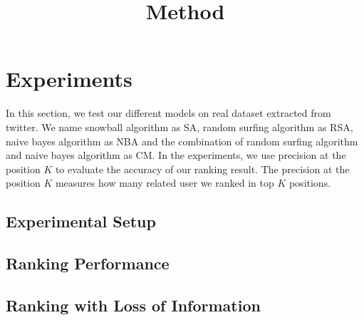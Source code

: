 \documentclass{article}
\begin{document}
\title{Method}
\maketitle \else \fi

\section{Experiments}\label{sec:experiment}
In this section, we test our different models on real dataset extracted from twitter. We name snowball algorithm as SA, random surfing algorithm as RSA, naive bayes algorithm as NBA and the combination of random surfing algorithm and naive bayes algorithm as CM. In the experiments, we use precision at the position $K$ to evaluate the accuracy of our ranking result. The precision at the position $K$ measures how many related user we ranked in top $K$ positions. 

\subsection{Experimental Setup}

\subsection{Ranking Performance}

\subsection{Ranking with Loss of Information}

\ifx \allfiles \undefined
\end{document}
